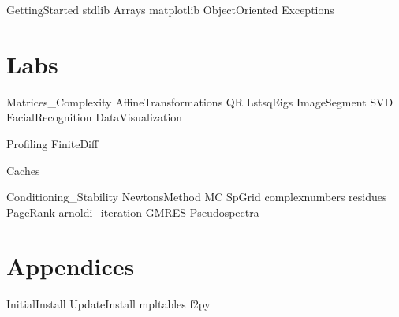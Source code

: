 \documentclass[nociteref]{SIAM-GH-book}
\begin{document}
{GettingStarted}
{stdlib}
{Arrays}
{matplotlib}
{ObjectOriented}
{Exceptions}

\part{Labs}
{Matrices_Complexity}
{AffineTransformations}
{QR}
{LstsqEigs}
{ImageSegment}
{SVD}
{FacialRecognition}
{DataVisualization}


{Profiling}
{FiniteDiff}

{Caches}

{Conditioning_Stability}
{NewtonsMethod}
{MC}
{SpGrid}
{complexnumbers}
{residues}
{PageRank}
{arnoldi_iteration}
{GMRES}
{Pseudospectra}


\part{Appendices}
\begin{appendices}
{InitialInstall}
{UpdateInstall}
{mpltables}
{f2py}
\end{appendices}
\end{document}
